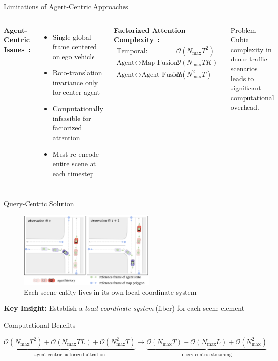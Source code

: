 \documentclass[10pt,aspectratio=169]{beamer}
\begin{document}
\begin{frame}{Limitations of Agent-Centric Approaches}
\begin{columns}[T]
\textbf{Agent-Centric Issues~\cite{qcnetZhou2023}:}
\begin{itemize}
    \item Single global frame centered on ego vehicle
    \item Roto-translation invariance only for center agent
    \item Computationally infeasible for factorized attention
    \item Must re-encode entire scene at each timestep
\end{itemize}

\textbf{Factorized Attention Complexity~\cite{qcnetZhou2023}:}
\begin{align}
\text{Temporal:} &\quad \mathcal{O}(N_{\max}T^{2}) \\
\text{Agent}\leftrightarrow\text{Map Fusion:} &\quad \mathcal{O}(N_{\max}T K) \\
\text{Agent}\leftrightarrow\text{Agent Fusion:} &\quad \mathcal{O}(N_{\max}^{2}T)
\end{align}

\begin{alertblock}{Problem}
Cubic complexity in dense traffic scenarios leads to significant computational overhead.
\end{alertblock}
\end{columns}
\end{frame}

\begin{frame}{Query-Centric Solution}
\begin{figure}[ht]
\centering
\includegraphics[width=0.6\textwidth]{docs/latex/figures/qc_reference_frame.png}
\caption{Each scene entity lives in its own local coordinate system~\cite{qcnetZhou2023}}
\end{figure}

\textbf{Key Insight:} Establish a \emph{local coordinate system} (fiber) for each scene element~\cite{qcnetZhou2023}

\begin{block}{Computational Benefits~\cite{qcnetZhou2023}}
\begin{center}
\scriptsize
$\underbrace{\mathcal{O}(N_{\max}T^2)+\mathcal{O}(N_{\max}TL)+\mathcal{O}(N_{\max}^2T)}_{\text{agent-centric factorized attention}}
\longrightarrow
\underbrace{\mathcal{O}(N_{\max}T)+\mathcal{O}(N_{\max}L)+\mathcal{O}(N_{\max}^2)}_{\text{query-centric streaming}}$
\end{center}
\end{block}
\end{frame}
\end{document}
